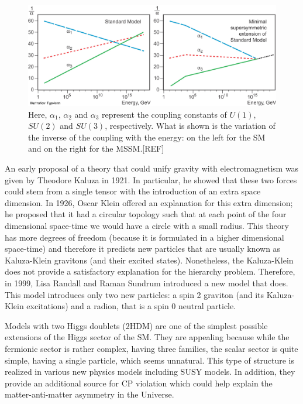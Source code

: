 \begin{figure}
	\includegraphics[width=\textwidth]{Figures/SM_MSSM.jpg}
	\caption{Here, $\alpha_1$, $\alpha_2$ and $\alpha_3$ represent the coupling constants of $U(1)$, $SU(2)$ and $SU(3)$, respectively. What is shown is the variation of the inverse of the coupling with the energy: on the left for the SM and on the right for the MSSM.[REF]}
	\label{fig:SM_MSSM}
\end{figure}

An early proposal of a theory that could unify gravity with electromagnetism was given by Theodore Kaluza in 1921. In particular, he showed that these two forces could stem from a single tensor with the introduction of an extra space dimension. In 1926, Oscar Klein offered an explanation for this extra dimension; he proposed that it had a circular topology such that at each point of the four dimensional space-time we would have a circle with a small radius. This theory has more degrees of freedom (because it is formulated in a higher dimensional space-time) and therefore it predicts new particles that are usually known as Kaluza-Klein gravitons (and their excited states). Nonetheless, the Kaluza-Klein does not provide a satisfactory explanation for the hierarchy problem. Therefore, in 1999, Lisa Randall and Raman Sundrum introduced a new model that does. This model introduces only two new particles: a spin 2 graviton (and its Kaluza-Klein excitations) and a radion, that is a spin 0 neutral particle.

Models with two Higgs doublets (2HDM) are one of the simplest possible extensions of the Higgs sector of the SM. They are appealing because while the fermionic sector is rather complex, having three families, the scalar sector is quite simple, having a single particle, which seems unnatural. This type of structure is realized in various new physics models including SUSY models. In addition, they provide an additional source for CP violation which could help explain the matter-anti-matter asymmetry in the Universe. 

